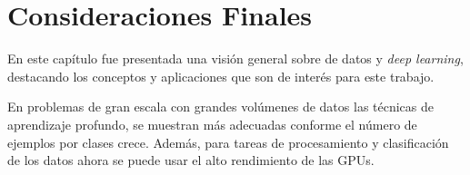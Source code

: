   

\section{Consideraciones Finales}\label{sec:consideraciones-finales}

En este capítulo fue presentada una visión general sobre de datos y \textit{deep learning}, destacando los conceptos y aplicaciones que son  de interés para este trabajo.

En problemas de gran escala con grandes volúmenes de datos las técnicas de aprendizaje profundo,  se muestran más adecuadas conforme el número de ejemplos por clases crece. Además, para tareas de procesamiento y clasificación de los datos  ahora se puede usar el alto rendimiento de las GPUs.    








